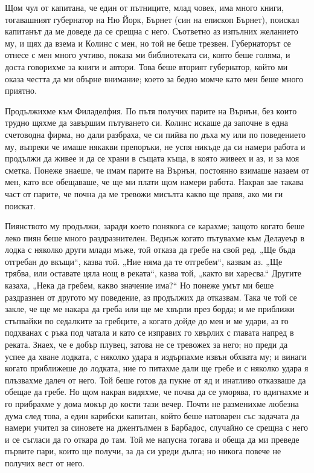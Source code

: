 \documentclass[12pt]{book}
\begin{document}
Щом чул от капитана, че един от пътниците, млад човек, има много книги, тогавашният губернатор на Ню Йорк, Бърнет (син на епископ Бърнет), поискал капитанът да ме доведе да се срещна с него. Съответно аз изпълних желанието му, и щях да взема и Колинс с мен, но той не беше трезвен. Губернаторът се отнесе с мен много учтиво, показа ми библиотеката си, която беше голяма, и доста говорихме за книги и автори. Това беше вторият губернатор, който ми оказа честта да ми обърне внимание; което за бедно момче като мен беше много приятно.

Продължихме към Филаделфия. По пътя получих парите на Върнън, без които трудно щяхме да завършим пътуването си. Колинс искаше да започне в една счетоводна фирма, но дали разбраха, че си пийва по дъха му или по поведението му, въпреки че имаше някакви препоръки, не успя никъде да си намери работа и продължи да живее и да се храни в същата къща, в която живеех и аз, и за моя сметка. Понеже знаеше, че имам парите на Върнън, постоянно взимаше назаем от мен, като все обещаваше, че ще ми плати щом намери работа. Накрая зае такава част от парите, че почна да ме тревожи мисълта какво ще правя, ако ми ги поискат. 

Пиянството му продължи, заради което понякога се карахме; защото когато беше леко пиян беше много раздразнителен. Веднъж когато пътувахме към Делауеър в лодка с няколко други млади мъже, той отказа да гребе на свой ред. „Ще бъда отгребан до вкъщи“, казва той. „Ние няма да те отгребем“, казвам аз. „Ще трябва, или оставате цяла нощ в реката“, казва той, „както ви харесва.“ Другите казаха, „Нека да гребем, какво значение има?“ Но понеже умът ми беше раздразнен от другото му поведение, аз продължих да отказвам. Така че той се закле, че ще ме накара да греба или ще ме хвърли през борда; и ме приближи стъпвайки по седалките за гребците, а когато дойде до мен и ме удари, аз го подхванах с ръка под чатала и като се изправих го хвърлих с главата напред в реката. Знаех, че е добър плувец, затова  не се тревожех за него; но преди да успее да хване лодката, с няколко удара я издърпахме извън обхвата му; и винаги когато приближеше до лодката, ние го питахме дали ще гребе и с няколко удара я плъзвахме далеч от него. Той беше готов да пукне от яд и инатливо отказваше да обещае да гребе. Но щом накрая видяхме, че почва да се уморява, го вдигнахме и го прибрахме у дома мокър до кости тази вечер. Почти не разменихме любезна дума след това, а един карибски капитан, който беше натоварен със задачата да намери учител за синовете на джентълмен в Барбадос, случайно се срещна с него и се съгласи да го откара до там. Той ме напусна тогава и обеща да ми преведе първите пари, които ще получи, за да си уреди дълга; но никога повече не получих вест от него.
\end{document}
